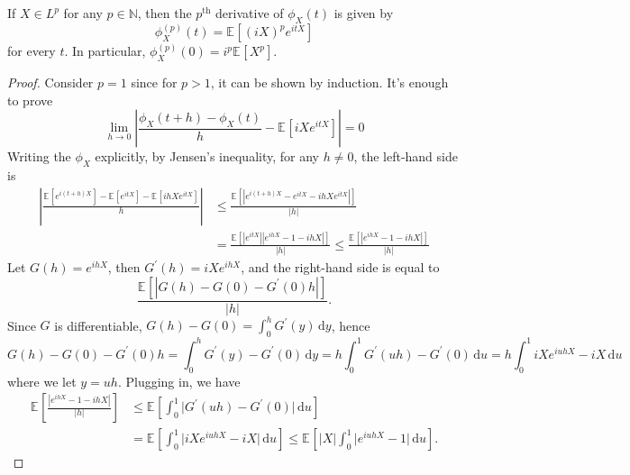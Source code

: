 \begin{theorem}\label{thm:characteristic-function-derivative}
	If \(X \in L ^p\) for any \(p \in \mathbb{N} \), then the \(p^{\text{th} }\) derivative of \(\phi _X(t)\) is given by
	\[
		\phi _X^{(p)} (t) = \mathbb{E}_{}[(iX)^p e^{itX}]
	\]
	for every \(t\). In particular, \(\phi _X^{(p)}(0) = i^p \mathbb{E}_{}[X^p] \).
\end{theorem}
\begin{proof}
	Consider \(p = 1\) since for \(p > 1\), it can be shown by induction. It's enough to prove
	\[
		\lim_{h \to 0} \left\vert \frac{\phi _X(t + h) - \phi _X(t)}{h} - \mathbb{E}_{}\left[i X e^{itX}\right] \right\vert = 0
	\]
	Writing the \(\phi _X\) explicitly, by Jensen's inequality, for any \(h \neq 0\), the left-hand side is
	\[
		\begin{split}
			\left\vert \frac{\mathbb{E}_{}\left[e^{i(t + h) X}\right] - \mathbb{E}_{}\left[e^{itX}\right] - \mathbb{E}_{}\left[ihX e^{itX}\right] }{h} \right\vert
			 & \leq \frac{\mathbb{E}_{}\left[\left\vert e^{i(t + h) X} - e^{itX} - ihX e^{itX} \right\vert \right] }{\vert h \vert }             \\
			 & = \frac{\mathbb{E}_{}\left[\left\vert e^{i t X}  \right\vert \left\vert e^{i h X} - 1 - ihX \right\vert \right] }{\vert h \vert }
			\leq \frac{\mathbb{E}_{}\left[\left\vert e^{i h X} - 1 - ihX \right\vert \right] }{\vert h \vert }
		\end{split}
	\]
	Let \(G(h) = e^{ihX}\), then \(G^{\prime} (h) = iX e^{ihX}\), and the right-hand side is equal to
	\[
		\frac{\mathbb{E}_{}\left[\left\vert G(h) - G(0) - G^{\prime} (0) h \right\vert \right]}{\vert h \vert } .
	\]
	Since \(G\) is differentiable, \(G(h)-G(0) = \int_{0}^{h} G^{\prime} (y) \,\mathrm{d}y \), hence
	\[
		G(h) - G(0) - G^{\prime} (0) h
		= \int_{0}^{h} G^{\prime} (y) - G^{\prime} (0) \,\mathrm{d}y
		= h \int_{0}^{1} G^{\prime} (uh) - G^{\prime} (0) \,\mathrm{d}u
		= h \int_{0}^{1} iX e^{iuhX} - iX \,\mathrm{d}u
	\]
	where we let \(y = u h\). Plugging in, we have
	\[
		\begin{split}
			\mathbb{E}_{}\left[\frac{\left\vert e^{ihX} - 1 - ihX \right\vert }{\vert h \vert }\right]
			 & \leq \mathbb{E}_{}\left[\int_{0}^{1} \vert G^{\prime} (uh) - G^{\prime} (0) \vert \,\mathrm{d}u \right] \\
			 & = \mathbb{E}_{}\left[\int_{0}^{1} \vert iX e^{iuhX} - iX \vert \,\mathrm{d}u \right]
			\leq \mathbb{E}_{}\left[\vert X \vert \int_{0}^{1} \vert e^{iuhX} - 1 \vert \,\mathrm{d}u \right].
		\end{split}
\]
\end{proof}

